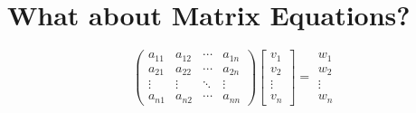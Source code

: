 \documentclass[12pt]{article}
\begin{document}
\section{What about Matrix Equations?}
\begin{equation*}
\begin{pmatrix}
a_{11} & a_{12} & \cdots & a_{1n} \\
a_{21} & a_{22} & \cdots & a_{2n} \\
\vdots  & \vdots  & \ddots & \vdots  \\
a_{n1} & a_{n2} & \cdots & a_{nn} 
\end{pmatrix}
\begin{bmatrix}
v_1 \\
v_2 \\
\vdots \\
v_n
\end{bmatrix}
=
\begin{matrix}
w_1 \\
w_2 \\
\vdots \\
w_n
\end{matrix}
\end{equation*}
\end{document}

